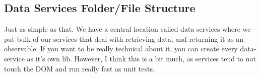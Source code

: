 \subsection{ Data Services Folder/File Structure }


Just as simple as that. We have a central location called data-services where
we put bulk of our services that deal with retrieving data, and returning it
as an observable. If you want to be really technical about it, you can create
every data-service as it's own lib. However, I think this is a bit much, as
services tend to not touch the DOM and run really fast as unit tests.

